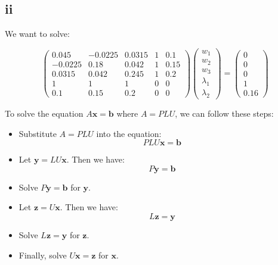 \documentclass{article}
\begin{document}
\subsection*{ii}
We want to solve:

\[
    \begin{pmatrix}
        0.045   & -0.0225 & 0.0315 & 1 & 0.1  \\
        -0.0225 & 0.18    & 0.042  & 1 & 0.15 \\
        0.0315  & 0.042   & 0.245  & 1 & 0.2  \\
        1       & 1       & 1      & 0 & 0    \\
        0.1     & 0.15    & 0.2    & 0 & 0
    \end{pmatrix}
    \begin{pmatrix}
        w_1       \\
        w_2       \\
        w_3       \\
        \lambda_1 \\
        \lambda_2
    \end{pmatrix}
    =
    \begin{pmatrix}
        0 \\
        0 \\
        0 \\
        1 \\
        0.16
    \end{pmatrix}
\]

To solve the equation \( A \mathbf{x} = \mathbf{b} \) where \( A = PLU \), we can follow these steps:

\begin{itemize}
    \item Substitute \( A = PLU \) into the equation:
          \[
              PLU \mathbf{x} = \mathbf{b}
          \]

    \item Let \( \mathbf{y} = LU \mathbf{x} \). Then we have:
          \[
              P \mathbf{y} = \mathbf{b}
          \]

    \item Solve \( P \mathbf{y} = \mathbf{b} \) for \( \mathbf{y} \).

    \item Let \( \mathbf{z} = U \mathbf{x} \). Then we have:
          \[
              L \mathbf{z} = \mathbf{y}
          \]

    \item Solve \( L \mathbf{z} = \mathbf{y} \) for \( \mathbf{z} \).

    \item Finally, solve \( U \mathbf{x} = \mathbf{z} \) for \( \mathbf{x} \).
\end{itemize}
\end{document}
